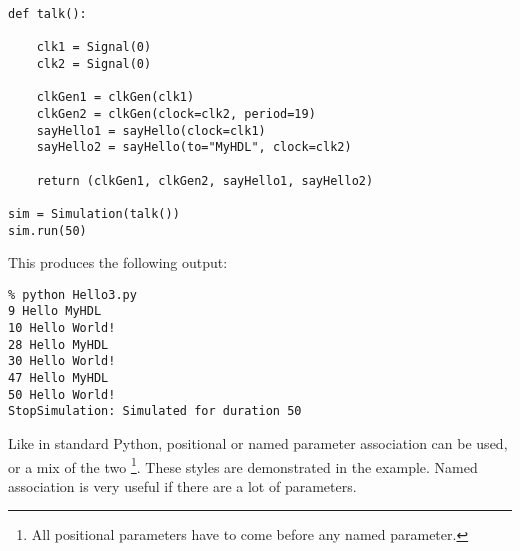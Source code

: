 \begin{verbatim}
def talk():

    clk1 = Signal(0)
    clk2 = Signal(0)
    
    clkGen1 = clkGen(clk1)
    clkGen2 = clkGen(clock=clk2, period=19)
    sayHello1 = sayHello(clock=clk1)
    sayHello2 = sayHello(to="MyHDL", clock=clk2)

    return (clkGen1, clkGen2, sayHello1, sayHello2) 

sim = Simulation(talk())
sim.run(50)

\end{verbatim}

This produces the following output:

\begin{verbatim}
% python Hello3.py
9 Hello MyHDL
10 Hello World!
28 Hello MyHDL
30 Hello World!
47 Hello MyHDL
50 Hello World!
StopSimulation: Simulated for duration 50

\end{verbatim}

Like in standard Python, positional or named parameter association can
be used, or a mix of the two \footnote{All positional parameters have
to come before any named parameter.}. These styles are demonstrated in
the example. Named association is very useful if there are a lot of
parameters. 

